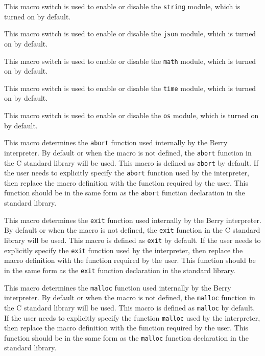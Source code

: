 
This macro switch is used to enable or disable the \texttt{string} module, which is turned on by default.


This macro switch is used to enable or disable the \texttt{json} module, which is turned on by default.


This macro switch is used to enable or disable the \texttt{math} module, which is turned on by default.


This macro switch is used to enable or disable the \texttt{time} module, which is turned on by default.


This macro switch is used to enable or disable the \texttt{os} module, which is turned on by default.


This macro determines the \texttt{abort} function used internally by the Berry interpreter. By default or when the macro is not defined, the \texttt{abort} function in the C standard library will be used. This macro is defined as \texttt{abort} by default. If the user needs to explicitly specify the \texttt{abort} function used by the interpreter, then replace the macro definition with the function required by the user. This function should be in the same form as the \texttt{abort} function declaration in the standard library.


This macro determines the \texttt{exit} function used internally by the Berry interpreter. By default or when the macro is not defined, the \texttt{exit} function in the C standard library will be used. This macro is defined as \texttt{exit} by default. If the user needs to explicitly specify the \texttt{exit} function used by the interpreter, then replace the macro definition with the function required by the user. This function should be in the same form as the \texttt{exit} function declaration in the standard library.


This macro determines the \texttt{malloc} function used internally by the Berry interpreter. By default or when the macro is not defined, the \texttt{malloc} function in the C standard library will be used. This macro is defined as \texttt{malloc} by default. If the user needs to explicitly specify the function \texttt{malloc} used by the interpreter, then replace the macro definition with the function required by the user. This function should be in the same form as the \texttt{malloc} function declaration in the standard library.

